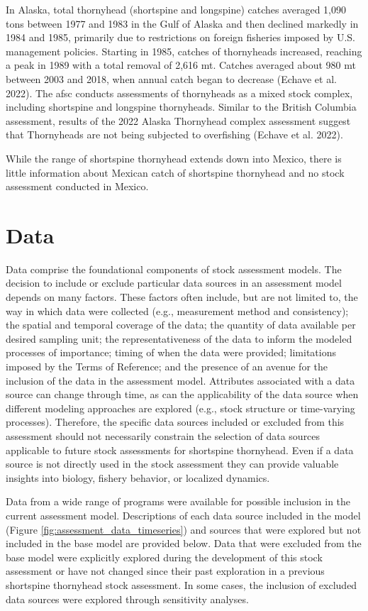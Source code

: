 \documentclass[11pt,
  english,
  letterpaper,
]{article}
\begin{document}
In Alaska, total thornyhead (shortspine and longspine) catches averaged 1,090 tons between 1977 and 1983 in the Gulf of Alaska and then declined markedly in 1984 and 1985, primarily due to restrictions on foreign fisheries imposed by U.S. management policies. Starting in 1985, catches of thornyheads increased, reaching a peak in 1989 with a total removal of 2,616 mt. Catches averaged about 980 mt between 2003 and 2018, when annual catch began to decrease (Echave et al. 2022). The \gls{afsc} conducts assessments of thornyheads as a mixed stock complex, including shortspine and longspine thornyheads. Similar to the British Columbia assessment, results of the 2022 Alaska Thornyhead complex assessment suggest that Thornyheads are not being subjected to overfishing (Echave et al. 2022).

While the range of shortspine thornyhead extends down into Mexico, there is little information about Mexican catch of shortspine thornyhead and no stock assessment conducted in Mexico.

\hypertarget{data}{%
\section{Data}\label{data}}

Data comprise the foundational components of stock assessment models. The decision to include or exclude particular data sources in an assessment model depends on many factors. These factors often include, but are not limited to, the way in which data were collected (e.g., measurement method and consistency); the spatial and temporal coverage of the data; the quantity of data available per desired sampling unit; the representativeness of the data to inform the modeled processes of importance; timing of when the data were provided; limitations imposed by the Terms of Reference; and the presence of an avenue for the inclusion of the data in the assessment model. Attributes associated with a data source can change through time, as can the applicability of the data source when different modeling approaches are explored (e.g., stock structure or time-varying processes). Therefore, the specific data sources included or excluded from this assessment should not necessarily constrain the selection of data sources applicable to future stock assessments for shortspine thornyhead. Even if a data source is not directly used in the stock assessment they can provide valuable insights into biology, fishery behavior, or localized dynamics.

Data from a wide range of programs were available for possible inclusion in the current assessment model. Descriptions of each data source included in the model (Figure \ref{fig:assessment_data_timeseries}) and sources that were explored but not included in the base model are provided below. Data that were excluded from the base model were explicitly explored during the development of this stock assessment or have not changed since their past exploration in a previous shortspine thornyhead stock assessment. In some cases, the inclusion of excluded data sources were explored through sensitivity analyses.
\end{document}
